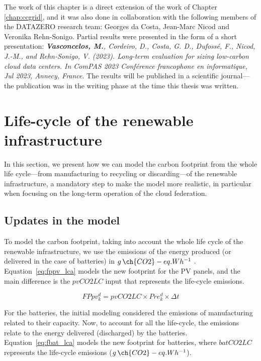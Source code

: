 The work of this chapter is a direct extension of the work of Chapter \ref{chap:ccgrid}, and it was also done in collaboration with the following members of the DATAZERO\cite{datazero} research team: Georges da Costa, Jean-Marc Nicod and Veronika Rehn-Sonigo. Partial results were presented in the form of a short presentation:   \textit{\textbf{Vasconcelos, M.}, Cordeiro, D., Costa, G. D., Dufossé, F., Nicod, J.-M., and Rehn-Sonigo, V. (2023). Long-term evaluation for sizing low-carbon cloud data centers. In ComPAS 2023 Conférence francophone en informatique, Jul 2023, Annecy, France}. The results will be published in a scientific journal---the publication was in the writing phase at the time this thesis was written. 




\section{Life-cycle of the renewable infrastructure}
\label{sec:lifecicle}

In this section, we present how we can model the carbon footprint from the whole life cycle---from manufacturing to recycling or discarding---of the renewable infrastructure,  a mandatory step to make the model more realistic, in particular when focusing on the long-term operation of the cloud federation.


\subsection{Updates in the model}

To model the carbon footprint, taking into account the whole life cycle of the renewable infrastructure,  we use the emissions of the energy produced (or delivered in the case of batteries) in $g\,\ch{CO2}-eq.Wh^{-1}$ . Equation~\eqref{eq:fppv_lca} models the new footprint for the PV panels, and the main difference is the $pvCO2LC$ input that represents the life-cycle emissions.

\begin{equation} \label{eq:fppv_lca}
   FPpv^d_k =  pvCO2LC \times Pre_k^d \times \Delta t
\end{equation}

For the batteries, the initial modeling considered the emissions of manufacturing related to their capacity. Now, to account for all the life-cycle, the emissions relate to the energy delivered (discharged) by the batteries. Equation~\eqref{eq:fbat_lca} models the new footprint for batteries, where $batCO2LC$ represents the life-cycle emissions  ($g\,\ch{CO2}-eq.Wh^{-1}$).

